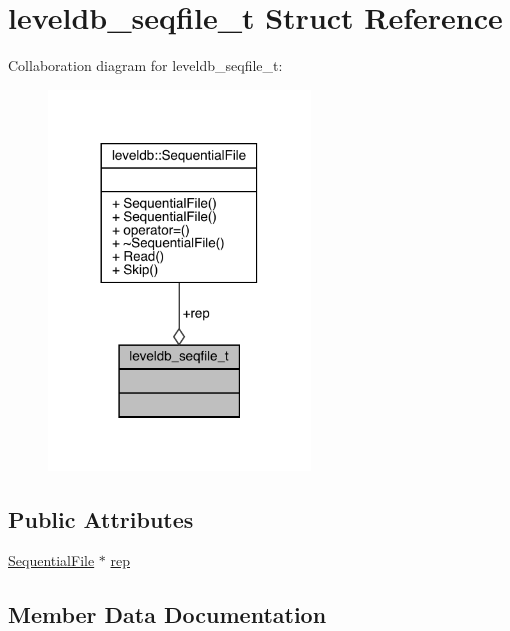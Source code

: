 \hypertarget{structleveldb__seqfile__t}{}\section{leveldb\+\_\+seqfile\+\_\+t Struct Reference}
\label{structleveldb__seqfile__t}


Collaboration diagram for leveldb\+\_\+seqfile\+\_\+t\+:
\nopagebreak
\begin{figure}[H]
\begin{center}
\leavevmode
\includegraphics[width=197pt]{structleveldb__seqfile__t__coll__graph}
\end{center}
\end{figure}
\subsection*{Public Attributes}
\begin{DoxyCompactItemize}
\item 
\mbox{\hyperlink{classleveldb_1_1_sequential_file}{Sequential\+File}} $\ast$ \mbox{\hyperlink{structleveldb__seqfile__t_a84b4a8638a6ad109e65b3c7923fde915}{rep}}
\end{DoxyCompactItemize}


\subsection{Member Data Documentation}
\mbox{\label{structleveldb__seqfile__t_a84b4a8638a6ad109e65b3c7923fde915}} 
